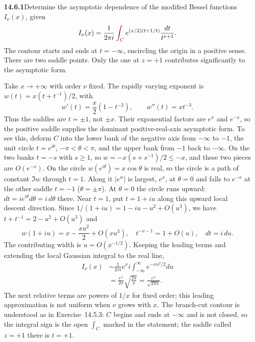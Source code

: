 \par\bigskip
\noindent\textbf{14.6.1}\quad Determine the asymptotic dependence of
the modified Bessel functions $I_{\nu}(x)$, given
\[
I_{\nu}(x)=\frac{1}{2\pi i}\mathop{\erratum{\int_{C}}}e^{(x/2)(t+1/t)}
\frac{dt}{t^{\nu+1}}.
\]
The contour starts and ends at $t=-\infty$, encircling the origin in a
positive sense. There are two saddle points. Only the one at $z=+1$
contributes significantly to the asymptotic form.
\par{}
\solution
Take $x\to+\infty$ with order $\nu$ fixed. The rapidly varying
exponent is $w(t)=x(t+t^{-1})/2$, with
\[
w'(t)=\frac x2(1-t^{-2}),\qquad w''(t)=xt^{-3}.
\]
Thus the saddles are $t=\pm1$, not $\pm x$.
Their exponential factors are $e^x$ and $e^{-x}$, so the positive
saddle supplies the dominant positive-real-axis asymptotic form.
To see this, deform $C$ into the lower bank of the negative axis
from $-\infty$ to $-1$, the unit circle $t=e^{i\theta}$,
$-\pi<\theta<\pi$, and the upper bank from $-1$ back to $-\infty$.
On the two banks $t=-s$ with $s\ge1$, so
$w=-x(s+s^{-1})/2\le-x$, and these two pieces are $O(e^{-x})$.
On the circle $w(e^{i\theta})=x\cos\theta$ is real, so the circle
is a path of constant $\Im w$ through $t=1$. Along it $|e^w|$ is
largest, $e^x$, at $\theta=0$ and falls to $e^{-x}$ at the
other saddle $t=-1$ ($\theta=\pm\pi$). At $\theta=0$ the circle
runs upward: $dt=ie^{i\theta}d\theta=i\,d\theta$ there.
Near $t=1$, put $t=1+iu$ along this upward local descent direction.
Since $1/(1+iu)=1-iu-u^2+O(u^3)$, we have $t+t^{-1}=2-u^2+O(u^3)$ and
\[
w(1+iu)=x-\frac{x u^2}{2}+O(xu^3),\quad
t^{-\nu-1}=1+O(u),\quad dt=i\,du.
\]
The contributing width is $u=O(x^{-1/2})$. Keeping the leading
terms and extending the local Gaussian integral to the real line,
\begin{align*}
I_\nu(x)&\sim\frac1{2\pi i}e^x i
\int_{-\infty}^{\infty}e^{-xu^2/2}du\\
&=\frac{e^x}{2\pi}\sqrt{\frac{2\pi}{x}}
=\boxed{\frac{e^x}{\sqrt{2\pi x}}}.
\end{align*}
The next relative terms are powers of $1/x$ for fixed order;
this leading approximation is not uniform when $\nu$ grows with
$x$. The branch-cut contour is understood as in Exercise~14.5.3:
$C$ begins and ends at $-\infty$ and is not closed, so the
integral sign is the open $\int_C$ marked in the statement; the
saddle called $z=+1$ there is $t=+1$.


